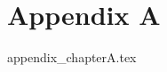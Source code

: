 \documentclass[12pt, openany]{book}
\begin{document}

% 
% 
\printbibliography[heading=bibintoc]

\appendix

\renewcommand{\thechapter}{\Alph{chapter}}

\chapter{Appendix A}
{appendix_chapterA.tex}
\end{document}
